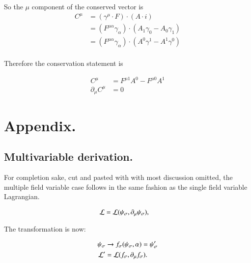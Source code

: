 \documentclass{article}
\begin{document}
So the $\mu$ component of the conserved vector is
\begin{align*}
C^\mu 
&= (\gamma^\mu \cdot F) \cdot (A \cdot i) \\
&= (F^{\mu\alpha} \gamma_\alpha) \cdot (A_1 \gamma_0 - A_0 \gamma_1) \\
&= (F^{\mu\alpha} \gamma_\alpha) \cdot (A^0 \gamma^1 - A^1 \gamma^0) \\
\end{align*}

Therefore the conservation statement is
%

\begin{align*}
C^\mu &= F^{\mu 1} A^0 - F^{\mu 0} A^1 \\
\partial_\mu C^\mu &= 0
\end{align*}

\section{ Appendix. }

\subsection{ Multivariable derivation. }

For completion sake, cut and pasted with with most discussion omitted, 
the multiple field variable case follows in the same fashion
as the single field variable Lagrangian.

\begin{align*}
\mathcal{L} &= \mathcal{L}(\psi_\sigma, \partial_\mu \psi_\sigma),
\end{align*}

The transformation is now:

\begin{align*}
\psi_\sigma &\rightarrow f_\sigma(\psi_\sigma, \alpha) = \psi_\sigma' \\
\mathcal{L}' &= \mathcal{L}(f_\sigma, \partial_\mu f_\sigma).
\end{align*}
\end{document}
